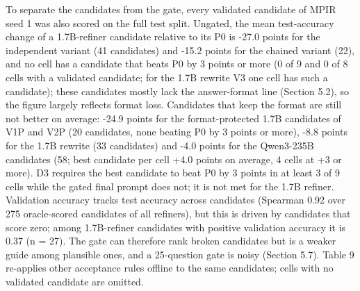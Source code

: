\documentclass{ieeeaccess}
\begin{document}
To separate the candidates from the gate, every validated candidate of MPIR seed 1 was also scored on the full test split. Ungated, the mean test-accuracy change of a 1.7B-refiner candidate relative to its P0 is -27.0 points for the independent variant (41 candidates) and -15.2 points for the chained variant (22), and no cell has a candidate that beats P0 by 3 points or more (0 of 9 and 0 of 8 cells with a validated candidate; for the 1.7B rewrite V3 one cell has such a candidate); these candidates mostly lack the answer-format line (Section 5.2), so the figure largely reflects format loss. Candidates that keep the format are still not better on average: -24.9 points for the format-protected 1.7B candidates of V1P and V2P (20 candidates, none beating P0 by 3 points or more), -8.8 points for the 1.7B rewrite (33 candidates) and -4.0 points for the Qwen3-235B candidates (58; best candidate per cell +4.0 points on average, 4 cells at +3 or more). D3 requires the best candidate to beat P0 by 3 points in at least 3 of 9 cells while the gated final prompt does not; it is not met for the 1.7B refiner. Validation accuracy tracks test accuracy across candidates (Spearman 0.92 over 275 oracle-scored candidates of all refiners), but this is driven by candidates that score zero; among 1.7B-refiner candidates with positive validation accuracy it is 0.37 (n = 27). The gate can therefore rank broken candidates but is a weaker guide among plausible ones, and a 25-question gate is noisy (Section 5.7). Table 9 re-applies other acceptance rules offline to the same candidates; cells with no validated candidate are omitted.
\end{document}
